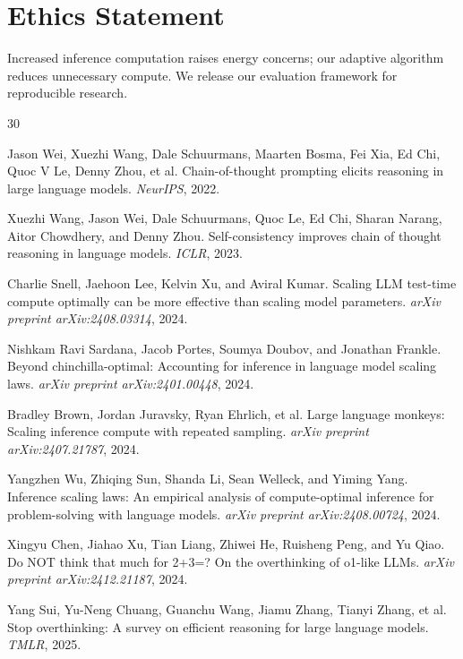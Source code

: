 \documentclass{article}
\begin{document}
\section*{Ethics Statement}

Increased inference computation raises energy concerns; our adaptive algorithm reduces unnecessary compute. We release our evaluation framework for reproducible research.


\begin{thebibliography}{30}

Jason Wei, Xuezhi Wang, Dale Schuurmans, Maarten Bosma, Fei Xia, Ed Chi, Quoc V Le, Denny Zhou, et al.
\newblock Chain-of-thought prompting elicits reasoning in large language models.
\newblock \emph{NeurIPS}, 2022.

Xuezhi Wang, Jason Wei, Dale Schuurmans, Quoc Le, Ed Chi, Sharan Narang, Aitor Chowdhery, and Denny Zhou.
\newblock Self-consistency improves chain of thought reasoning in language models.
\newblock \emph{ICLR}, 2023.

Charlie Snell, Jaehoon Lee, Kelvin Xu, and Aviral Kumar.
\newblock Scaling LLM test-time compute optimally can be more effective than scaling model parameters.
\newblock \emph{arXiv preprint arXiv:2408.03314}, 2024.

Nishkam Ravi Sardana, Jacob Portes, Soumya Doubov, and Jonathan Frankle.
\newblock Beyond chinchilla-optimal: Accounting for inference in language model scaling laws.
\newblock \emph{arXiv preprint arXiv:2401.00448}, 2024.

Bradley Brown, Jordan Juravsky, Ryan Ehrlich, et al.
\newblock Large language monkeys: Scaling inference compute with repeated sampling.
\newblock \emph{arXiv preprint arXiv:2407.21787}, 2024.

Yangzhen Wu, Zhiqing Sun, Shanda Li, Sean Welleck, and Yiming Yang.
\newblock Inference scaling laws: An empirical analysis of compute-optimal inference for problem-solving with language models.
\newblock \emph{arXiv preprint arXiv:2408.00724}, 2024.

Xingyu Chen, Jiahao Xu, Tian Liang, Zhiwei He, Ruisheng Peng, and Yu Qiao.
\newblock Do NOT think that much for 2+3=? On the overthinking of o1-like LLMs.
\newblock \emph{arXiv preprint arXiv:2412.21187}, 2024.

Yang Sui, Yu-Neng Chuang, Guanchu Wang, Jiamu Zhang, Tianyi Zhang, et al.
\newblock Stop overthinking: A survey on efficient reasoning for large language models.
\newblock \emph{TMLR}, 2025.


\end{thebibliography}
\end{document}
